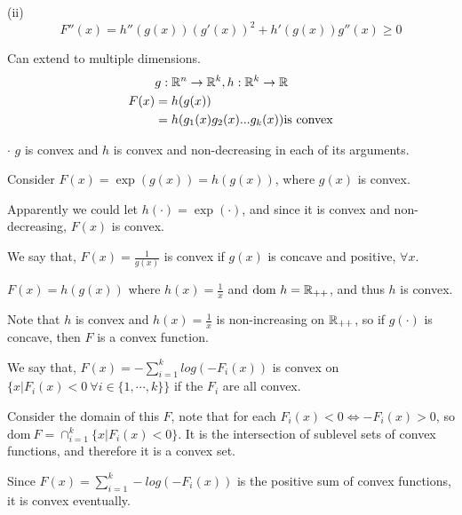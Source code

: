 (ii) 
\begin{equation*}
F''(x) = h''(g(x))(g'(x))^2 + h'(g(x))g''(x) \geq 0
\end{equation*}

Can extend to multiple dimensions.
\begin{align*}
&g:\mathbb{R}^n\rightarrow \mathbb{R}^k, h:\mathbb{R}^k\rightarrow \mathbb{R}\\
F(x) &= h(g(x))\\
&= h(g_1(x) g_2(x)...g_k(x)) \text{is convex}
\end{align*}

$\cdot$ $g$ is convex and $h$ is convex and non-decreasing in each of its arguments. 



\begin{example}
	
	Consider $F(x) = \exp(g(x)) = h(g(x))$, where $g(x)$ is convex. 
	
	Apparently we could let $h(\cdot) = \exp(\cdot)$, and since it is convex and non-decreasing, $F(x)$ is convex. 
\end{example}


\begin{example}
	
	We say that, $F(x) = \frac{1}{g(x)}$ is convex if $g(x)$ is concave and positive, $\forall x$. 
	
	$F(x) = h(g(x))$ where $h(x) = \frac{1}{x}$ and $\text{dom}\ h = \mathbb{R}_{++}$, and thus $h$ is convex.
	
	Note that $h$ is convex and $h(x) = \frac{1}{x}$ is non-increasing on $\mathbb{R}_{++}$, so if $g(\cdot)$ is concave, then $F$ is a convex function.
\end{example}


\begin{example}
	We say that, $F(x) = -\sum^k_{i=1}log(-F_i(x))$ is convex on $\{x\vert F_i(x)<0\ \forall i\in \{1,\cdots,k \}  \}$ if the $F_i$ are all convex.
	
	Consider the domain of this $F$, note that for each $F_i(x)<0\Leftrightarrow -F_i(x) >0$, so $\text{dom}\ F = \cap^k_{i=1}\{x\vert F_i(x) <0 \}$. It is the intersection of sublevel sets of convex functions, and therefore it is a convex set.
		
	Since $F(x) = \sum^k_{i=1} -log(-F_i(x))$ is the positive sum of convex functions, it is convex eventually.
\end{example}
